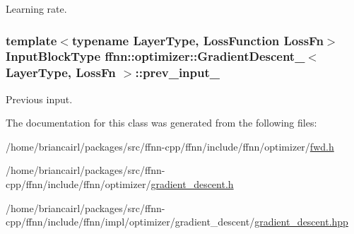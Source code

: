Learning rate. 

\hypertarget{classffnn_1_1optimizer_1_1_gradient_descent___a6a51e6729537c7de173ea53a27965415}{
\subsubsection[{prev\-\_\-input\-\_\-}]{\setlength{\rightskip}{0pt plus 5cm}template$<$typename Layer\-Type, Loss\-Function Loss\-Fn$>$ {\bf Input\-Block\-Type} {\bf ffnn\-::optimizer\-::\-Gradient\-Descent\-\_\-}$<$ Layer\-Type, Loss\-Fn $>$\-::prev\-\_\-input\-\_\-\hspace{0.3cm}{\ttfamily [protected]}}}\label{classffnn_1_1optimizer_1_1_gradient_descent___a6a51e6729537c7de173ea53a27965415}


Previous input. 



The documentation for this class was generated from the following files\-:\begin{DoxyCompactItemize}
\item 
/home/briancairl/packages/src/ffnn-\/cpp/ffnn/include/ffnn/optimizer/\hyperlink{fwd_8h}{fwd.\-h}\item 
/home/briancairl/packages/src/ffnn-\/cpp/ffnn/include/ffnn/optimizer/\hyperlink{gradient__descent_8h}{gradient\-\_\-descent.\-h}\item 
/home/briancairl/packages/src/ffnn-\/cpp/ffnn/include/ffnn/impl/optimizer/gradient\-\_\-descent/\hyperlink{gradient__descent_8hpp}{gradient\-\_\-descent.\-hpp}\end{DoxyCompactItemize}
